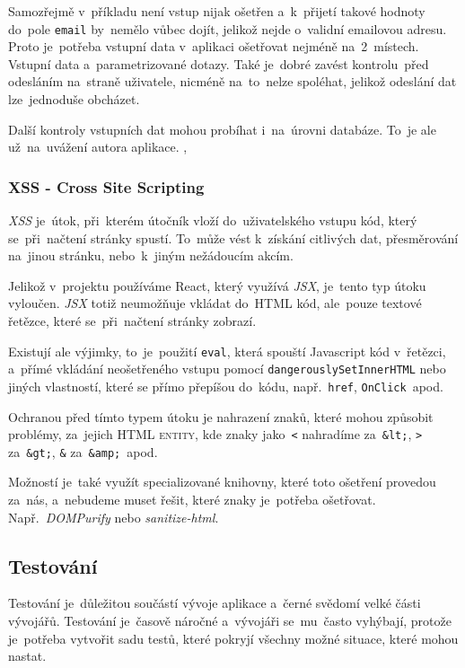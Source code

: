 \documentclass[14pt,a4paper]{article}
\begin{document}
            Samozřejmě v~příkladu není vstup nijak ošetřen a~k~přijetí takové hodnoty do~pole \texttt{email} by~nemělo vůbec dojít, jelikož nejde o~validní emailovou adresu. Proto je~potřeba vstupní data v~aplikaci ošetřovat nejméně na~2~místech. Vstupní data a~parametrizované dotazy. Také je~dobré zavést kontrolu~před odesláním na~straně uživatele, nicméně na~to~nelze spoléhat, jelikož odeslání dat lze~jednoduše obcházet.
            
            Další kontroly vstupních dat mohou probíhat i~na~úrovni databáze. To~je ale už~na~uvážení autora aplikace. \cite{w3s:SQLInjection}, \cite{itnetwork:SQLInjection}

            \subsubsection{XSS - Cross Site Scripting}
            \emph{XSS} je~útok, při~kterém útočník vloží do~uživatelského vstupu kód, který se~při~načtení stránky spustí. To~může vést k~získání citlivých dat, přesměrování na~jinou stránku, nebo~k~jiným nežádoucím akcím.

            Jelikož v~projektu používáme React, který využívá \emph{JSX}, je~tento typ útoku vyloučen. \emph{JSX} totiž neumožňuje vkládat do~HTML kód, ale~pouze textové řetězce, které se~při~načtení stránky zobrazí.

            Existují ale výjimky, to~je~použití \texttt{eval}, která spouští Javascript kód v~řetězci, a~přímé vkládání neošetřeného vstupu pomocí \texttt{dangerouslySetInnerHTML} nebo jiných vlastností, které se přímo přepíšou do~kódu, např.~\texttt{href}, \texttt{OnClick}~apod.

            Ochranou před tímto typem útoku je nahrazení znaků, které mohou způsobit problémy, za~jejich \textsc{HTML entity}, kde znaky jako~\texttt{<} nahradíme za~\texttt{\&lt;}, \texttt{>} za~\texttt{\&gt;}, \texttt{\&} za~\texttt{\&amp;}~apod.
            
            Možností je~také využít specializované knihovny, které toto ošetření provedou za~nás, a~nebudeme muset řešit, které znaky je~potřeba ošetřovat. Např.~\emph{DOMPurify} nebo \emph{sanitize-html}. \cite{w3s:XSS}

        \subsection{Testování}
        Testování je~důležitou součástí vývoje aplikace a~černé svědomí velké části vývojářů. Testování je~časově náročné a~vývojáři se~mu~často vyhýbají, protože je~potřeba vytvořit sadu testů, které pokryjí všechny možné situace, které mohou nastat.
        
\end{document}
